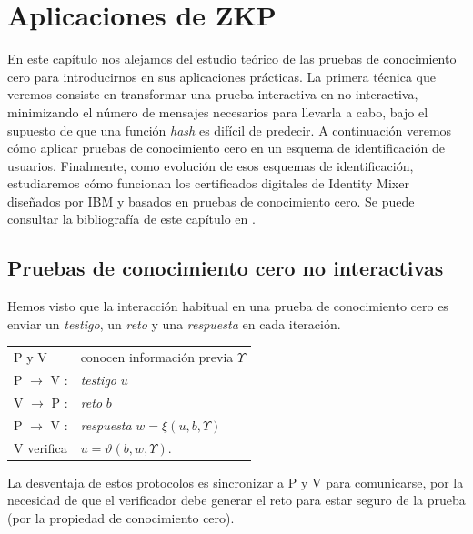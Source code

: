 \chapter{Aplicaciones de ZKP}\label{ch:aplicaciones} 


En este capítulo nos alejamos del estudio teórico de las pruebas de conocimiento cero para introducirnos en sus aplicaciones prácticas. La primera técnica que veremos consiste en transformar una prueba interactiva en no interactiva, minimizando el número de mensajes necesarios para llevarla a cabo, bajo el supuesto de que una función \textit{hash} es difícil de predecir. A continuación veremos cómo aplicar pruebas de conocimiento cero en un esquema de identificación de usuarios. Finalmente, como evolución de esos esquemas de identificación, estudiaremos cómo funcionan los certificados digitales de Identity Mixer diseñados por IBM y basados en pruebas de conocimiento cero. Se puede consultar la bibliografía de este capítulo en \citep{menezes1996handbook,stinson2005cryptography,idemixSpec}.



\section{Pruebas de conocimiento cero no interactivas}

Hemos visto que la interacción habitual en una prueba de conocimiento cero es enviar un \textit{testigo}, un \textit{reto} y una \textit{respuesta} en cada iteración.

\begin{center}
	\begin{tabular}{ll}
		P y V & conocen información previa $\Upsilon$
		\\
		P $\rightarrow$ V :& \textit{testigo} $u$
		\\
		V $\rightarrow$ P :& \textit{reto} $b$
		\\
		P $\rightarrow$ V :& \textit{respuesta} $w = \xi(u,b,\Upsilon)$
		\\
		V verifica & $u=\vartheta(b,w,\Upsilon)$.
	\end{tabular}
\end{center}

\hfil

La desventaja de estos protocolos es sincronizar a P y V para comunicarse, por la necesidad de que el verificador debe generar el reto para estar seguro de la prueba (por la propiedad de conocimiento cero).


